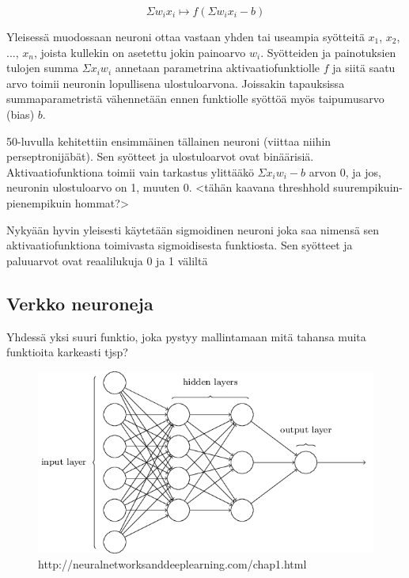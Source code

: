 \documentclass[11pt]{article}
\theoremstyle{plain}
\theoremstyle{definition}
\begin{document}
    \begin{equation}
      \label{eq:neuroni}
      \Sigma w_i x_i \mapsto f(\Sigma w_i x_i - b)
    \end{equation}

    Yleisessä muodossaan neuroni ottaa vastaan yhden tai useampia syötteitä $x_1$, $x_2$, ..., $x_n$, joista kullekin on asetettu jokin painoarvo $w_i$. Syötteiden ja painotuksien tulojen summa $\Sigma x_i w_i$ annetaan parametrina aktivaatiofunktiolle $f$ ja siitä saatu arvo toimii neuronin lopullisena ulostuloarvona. Joissakin tapauksissa summaparametristä vähennetään ennen funktiolle syöttöä myös taipumusarvo (bias) $b$.


    50-luvulla kehitettiin ensimmäinen tällainen neuroni (viittaa niihin perseptronijäbät). Sen syötteet ja ulostuloarvot ovat binäärisiä. Aktivaatiofunktiona toimii vain tarkastus ylittääkö $\Sigma x_i w_i - b$ arvon 0, ja jos, neuronin ulostuloarvo on 1, muuten 0.
    <tähän kaavana threshhold suurempikuin-pienempikuin hommat?>

    Nykyään hyvin yleisesti käytetään sigmoidinen neuroni joka saa nimensä sen aktivaatiofunktiona toimivasta sigmoidisesta funktiosta. Sen syötteet ja paluuarvot ovat reaalilukuja 0 ja 1 väliltä



  \subsection{Verkko neuroneja}

  Yhdessä yksi suuri funktio, joka pystyy mallintamaan mitä tahansa muita funktioita karkeasti tjsp?

  \begin{figure}[h]
  \centering
  \includegraphics[scale=0.5]{basic-neuralnet}
  \caption{http://neuralnetworksanddeeplearning.com/chap1.html}
  \end{figure}
\end{document}
